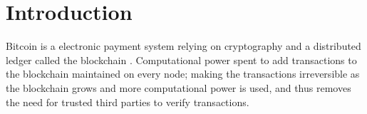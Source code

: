 \chapter{Introduction}
\label{chap:introduction}

Bitcoin is a electronic payment system relying on cryptography and a distributed ledger called the blockchain \cite{nakamoto2008}.
Computational power spent to add transactions to the blockchain maintained on every node; making the transactions irreversible as the blockchain grows and more computational power is used, and thus removes the need for trusted third parties to verify transactions.
